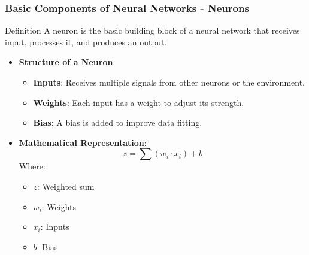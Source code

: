 \documentclass[aspectratio=169]{beamer}
\begin{document}
\begin{frame}[fragile]
  \frametitle{Basic Components of Neural Networks - Neurons}
  \begin{block}{Definition}
      A neuron is the basic building block of a neural network that receives input, processes it, and produces an output.
  \end{block}
  
  \begin{itemize}
      \item \textbf{Structure of a Neuron}:
          \begin{itemize}
              \item \textbf{Inputs}: Receives multiple signals from other neurons or the environment.
              \item \textbf{Weights}: Each input has a weight to adjust its strength.
              \item \textbf{Bias}: A bias is added to improve data fitting.
          \end{itemize}
  
      \item \textbf{Mathematical Representation}:
          \begin{equation}
              z = \sum (w_i \cdot x_i) + b
          \end{equation}
          Where:
          \begin{itemize}
              \item \( z \): Weighted sum
              \item \( w_i \): Weights
              \item \( x_i \): Inputs
              \item \( b \): Bias
          \end{itemize}
  \end{itemize}
\end{frame}
\end{document}
